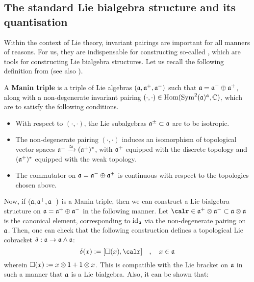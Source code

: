     \subsection{The standard Lie bialgebra structure and its quantisation}
        Within the context of Lie theory, invariant pairings are important for all manners of reasons. For us, they are indispensable for constructing so-called , which are tools for constructing Lie bialgebra structures. Let us recall the following definition from \cite[Subsection 2.6]{appel_laredo_2_categorical_etingof_kazhdan_quantisation} (see also \cite[Subsection 7.4]{etingof_kazhdan_quantisation_1}).
        \begin{definition} \label{def: manin_triples}
            A \textbf{Manin triple} is a triple of Lie algebras $(\mathfrak{a}, \mathfrak{a}^+, \mathfrak{a}^-)$ such that $\mathfrak{a} = \mathfrak{a}^- \oplus \mathfrak{a}^+$, along with a non-degenerate invariant pairing $(\cdot, \cdot) \in \operatorname{Hom}( \operatorname{Sym}^2(\mathfrak{a})^{\mathfrak{a}}, \mathbb{C} )$, which are to satisfy the following conditions.
            \begin{itemize}
                \item With respect to $(\cdot, \cdot)$, the Lie subalgebras $\mathfrak{a}^{\pm} \subset \mathfrak{a}$ are to be isotropic. 
                \item The non-degenerate pairing $(\cdot, \cdot)$ induces an isomorphism of topological vector spaces $\mathfrak{a}^- \xrightarrow[]{\simeq} (\mathfrak{a}^+)^*$, with $\mathfrak{a}^+$ equipped with the discrete topology and $(\mathfrak{a}^+)^*$ equipped with the weak topology.
                \item The commutator on $\mathfrak{a} = \mathfrak{a}^- \oplus \mathfrak{a}^+$ is continuous with respect to the topologies chosen above. 
            \end{itemize}
        \end{definition}
        Now, if $(\mathfrak{a}, \mathfrak{a}^+, \mathfrak{a}^-)$ is a Manin triple, then we can construct a Lie bialgebra structure on $\mathfrak{a} = \mathfrak{a}^+ \oplus \mathfrak{a}^-$ in the following manner. Let $\calr \in \a^+ \tensor \a^- \subset \a \tensor \a$ is the canonical element, corresponding to $\mathrm{id}_{\mathfrak{a}}$ via the non-degenerate pairing on $\mathfrak{a}$. Then, one can check that the following construction defines a topological Lie cobracket $\delta: \mathfrak{a} \to \mathfrak{a} \wedge \mathfrak{a}$:
            \begin{equation}
                \delta(x) := [\Box(x), \calr] \quad, \quad x \in \a
            \end{equation}
        wherein $\Box(x) := x \tensor 1 + 1 \tensor x$. This is compatible with the Lie bracket on $\mathfrak{a}$ in such a manner that $\mathfrak{a}$ is a Lie bialgebra. Also, it can be shown that:

